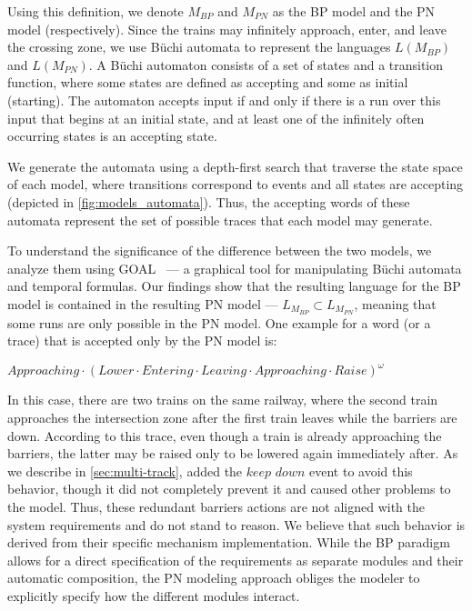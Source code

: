 \documentclass[10pt,journal,compsoc]{IEEEtran}
\theoremstyle{definition}
\begin{document}
Using this definition, we denote $M_{BP}$ and $M_{PN}$ as the BP model and the PN model (respectively). Since the trains may infinitely approach, enter, and leave the crossing zone, we use B\"uchi automata to represent the languages  $L(M_{BP})$ and $L(M_{PN})$. 
A B\"uchi automaton consists of a set of states and a transition function, where some states are defined as accepting and some as initial (starting). The automaton accepts input if and only if there is a run over this input that begins at an initial state, and  at least one of the infinitely often occurring states is an accepting state. 

We generate the automata using a depth-first search that traverse the state space of each model, where transitions correspond to events and all states are accepting (depicted in \autoref{fig:models_automata}). Thus, the accepting words of these automata represent the set of possible traces that each model may generate. 

To understand the significance of the difference between the two models, we analyze them using GOAL~\cite{tsay2007goal} --- a graphical tool for manipulating B\"uchi automata and temporal formulas. Our findings show that the resulting language for the BP model is contained in the resulting PN model --- $L_{M_{BP}} \subset L_{M_{PN}}$, meaning that some runs are only possible in the PN model. One example for a word (or a trace) that is accepted only by the PN model is:

\noindent $Approaching\cdot ( Lower\cdot Entering\cdot Leaving\cdot Approaching\cdot\allowbreak Raise)^\omega$

In this case, there are two trains on the same railway, where the second train approaches the intersection zone after the first train leaves while the barriers are down. According to this trace, even though a train is already approaching the barriers, the latter may be raised only to be lowered again immediately after. As we describe in \autoref{sec:multi-track}, \cite{ghazel2016customizable} added the $\mathit{keep}$ $\mathit{down}$ event to avoid this behavior, though it did not completely prevent it and caused other problems to the model. Thus, these redundant barriers actions are not aligned with the system requirements and do not stand to reason. We believe that such behavior is derived from their specific mechanism implementation. While the BP paradigm allows for a direct specification of the requirements as separate modules and their automatic composition, the PN modeling approach obliges the modeler to explicitly specify how the different modules interact.
\end{document}
